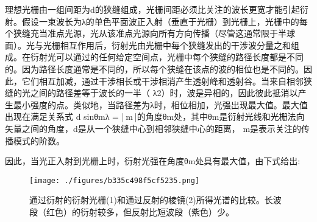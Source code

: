 理想光栅由一组间距为d的狭缝组成，光栅间距必须比关注的波长更宽才能引起衍射。假设一束波长为λ的单色平面波正入射（垂直于光栅）到光栅上，光栅中的每个狭缝充当准点光源，光从该准点光源向所有方向传播（尽管这通常限于半球面）。光与光栅相互作用后，衍射光由光栅中每个狭缝发出的干涉波分量之和组成。在衍射光可以通过的任何给定空间点，光栅中每个狭缝的路径长度都是不同的。因为路径长度通常是不同的，所以每个狭缝在该点的波的相位也是不同的。因此，它们相互加减，通过干涉相长或干涉相消产生透射峰和透射谷。当来自相邻狭缝的光之间的路径差等于波长的一半（ λ2）时，波是异相的，因此彼此抵消以产生最小强度的点。类似地，当路径差为λ时，相位相加，光强出现最大值。最大值出现在满足关系式 d sinθmλ = | m |的角度θm处，其中θm是衍射光线和光栅法向矢量之间的角度，d是从一个狭缝中心到相邻狭缝中心的距离， m是表示关注的传播模式的阶数。

因此，当光正入射到光栅上时，衍射光强在角度θm处具有最大值，由下式给出:

\begin{figure}[ht]
\centering
\texttt{[image: ./figures/b335c498f5cf5235.png]}
\caption{通过衍射的衍射光栅(1)和通过反射的棱镜(2)所得光谱的比较。长波段（红色）的衍射较多，但反射比短波段（紫色）少。} \label{fig_YSGS_2}
\end{figure}

